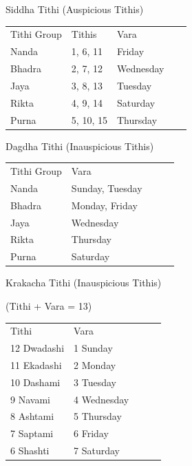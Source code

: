 \begin{enumerate}
\begin{enumerate}
 

Siddha Tithi  (Auspicious Tithis)

 
\begin{center}
\begin{tabular}{ l l l}
Tithi  Group	&Tithis	&Vara                                     \\
Nanda	&1,  6,  11&	Friday                              \\
Bhadra	&2,  7,  12	&Wednesday                              \\
Jaya	&3,  8,  13	&Tuesday                              \\
Rikta&	4,  9,  14	&Saturday                              \\
Purna	&5, 10, 15	&Thursday                              \\
 \end{tabular}
\end{center}

Dagdha Tithi  (Inauspicious Tithis)

 
\begin{center}
\begin{tabular}{ l l l}
Tithi  Group	&Vara                              \\
Nanda	&Sunday, Tuesday                              \\

Bhadra	&Monday, Friday                              \\

Jaya	&Wednesday                              \\
Rikta	&Thursday                              \\
Purna	&Saturday                              \\
  \end{tabular}
\end{center}

Krakacha  Tithi  (Inauspicious Tithis)

(Tithi + Vara = 13)

 
\begin{center}
\begin{tabular}{ l l l}
Tithi	&Vara \\
12 Dwadashi	&1 Sunday                             \\
11 Ekadashi	&2 Monday                             \\
10 Dashami	&3 Tuesday                             \\
  9 Navami	&4 Wednesday                             \\
  8 Ashtami	&5 Thursday                             \\
  7 Saptami	&6 Friday                             \\
  6 Shashti	&7 Saturday                             \\
   \end{tabular}
\end{center}


\end{enumerate}
\end{enumerate}
